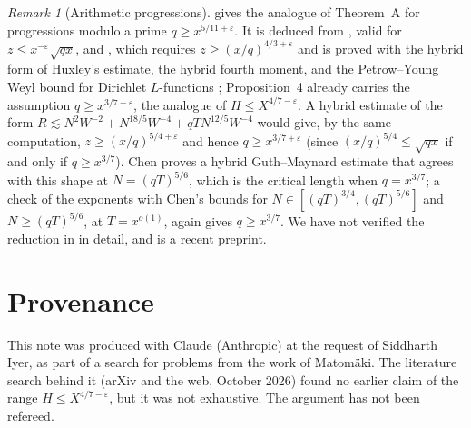 \documentclass[11pt]{amsart}
\theoremstyle{remark}
\newtheorem{remark}[theorem]{Remark}
\newcommand{\eps}{\varepsilon}
\begin{document}
\begin{remark}[Arithmetic progressions]\label{rem:ap}
\cite[Theorem~2]{GMRR} gives the analogue of Theorem~A for progressions modulo a
prime $q\ge x^{5/11+\eps}$.  It is deduced from \cite[Proposition~3]{GMRR}, valid
for $z\le x^{-\eps}\sqrt{qx}$, and \cite[Proposition~4]{GMRR}, which requires
$z\ge(x/q)^{4/3+\eps}$ and is proved with the hybrid form of Huxley's estimate,
the hybrid fourth moment, and the Petrow--Young Weyl bound for Dirichlet
$L$-functions \cite{PY}; Proposition~4 already carries the assumption
$q\ge x^{3/7+\eps}$, the analogue of $H\le X^{4/7-\eps}$.  A hybrid estimate of the form
$R\lesssim N^2W^{-2}+N^{18/5}W^{-4}+qTN^{12/5}W^{-4}$ would give, by the same
computation, $z\ge(x/q)^{5/4+\eps}$ and hence $q\ge x^{3/7+\eps}$ (since
$(x/q)^{5/4}\le\sqrt{qx}$ if and only if $q\ge x^{3/7}$).  Chen \cite[Theorem~1.3]{Ch} proves a
hybrid Guth--Maynard estimate that agrees with this shape at $N=(qT)^{5/6}$, which is
the critical length when $q=x^{3/7}$; a check of the exponents with Chen's bounds
for $N\in[(qT)^{3/4},(qT)^{5/6}]$ and $N\ge(qT)^{5/6}$, at $T=x^{o(1)}$, again
gives $q\ge x^{3/7}$.  We have not verified the reduction in
\cite[Proposition~4]{GMRR} in detail, and \cite{Ch} is a recent preprint.
\end{remark}

\section*{Provenance}
This note was produced with Claude (Anthropic) at the request of Siddharth Iyer,
as part of a search for problems from the work of Matom\"aki.  The literature
search behind it (arXiv and the web, October 2026) found no earlier claim of the
range $H\le X^{4/7-\eps}$, but it was not exhaustive.  The argument has not been
refereed.
\end{document}
